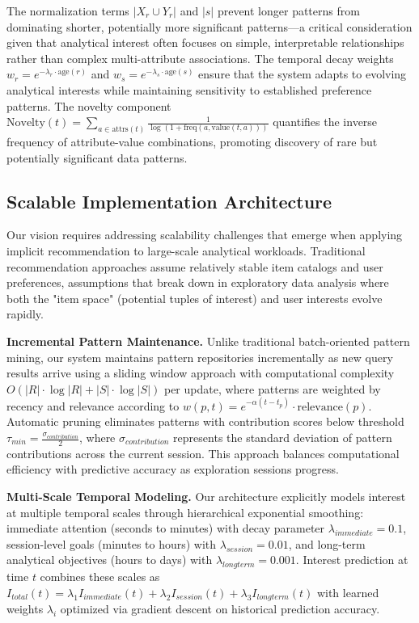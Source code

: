\documentclass[sigconf, nonacm]{acmart}
\begin{document}
The normalization terms $|X_r \cup Y_r|$ and $|s|$ prevent longer patterns from dominating shorter, potentially more significant patterns—a critical consideration given that analytical interest often focuses on simple, interpretable relationships rather than complex multi-attribute associations. The temporal decay weights $w_r = e^{-\lambda_r \cdot \text{age}(r)}$ and $w_s = e^{-\lambda_s \cdot \text{age}(s)}$ ensure that the system adapts to evolving analytical interests while maintaining sensitivity to established preference patterns. The novelty component $\text{Novelty}(t) = \sum_{a \in \text{attrs}(t)} \frac{1}{\log(1 + \text{freq}(a, \text{value}(t, a)))}$ quantifies the inverse frequency of attribute-value combinations, promoting discovery of rare but potentially significant data patterns.

\subsection{Scalable Implementation Architecture}

Our vision requires addressing scalability challenges that emerge when applying implicit recommendation to large-scale analytical workloads. Traditional recommendation approaches assume relatively stable item catalogs and user preferences, assumptions that break down in exploratory data analysis where both the "item space" (potential tuples of interest) and user interests evolve rapidly.

\textbf{Incremental Pattern Maintenance.} Unlike traditional batch-oriented pattern mining, our system maintains pattern repositories incrementally as new query results arrive using a sliding window approach with computational complexity $O(|R| \cdot \log|R| + |S| \cdot \log|S|)$ per update, where patterns are weighted by recency and relevance according to $w(p, t) = e^{-\alpha(t - t_p)} \cdot \text{relevance}(p)$. Automatic pruning eliminates patterns with contribution scores below threshold $\tau_{min} = \frac{\sigma_{contribution}}{2}$, where $\sigma_{contribution}$ represents the standard deviation of pattern contributions across the current session. This approach balances computational efficiency with predictive accuracy as exploration sessions progress.

\textbf{Multi-Scale Temporal Modeling.} Our architecture explicitly models interest at multiple temporal scales through hierarchical exponential smoothing: immediate attention (seconds to minutes) with decay parameter $\lambda_{immediate} = 0.1$, session-level goals (minutes to hours) with $\lambda_{session} = 0.01$, and long-term analytical objectives (hours to days) with $\lambda_{longterm} = 0.001$. Interest prediction at time $t$ combines these scales as $I_{total}(t) = \lambda_1 I_{immediate}(t) + \lambda_2 I_{session}(t) + \lambda_3 I_{longterm}(t)$ with learned weights $\lambda_i$ optimized via gradient descent on historical prediction accuracy.
\end{document}
